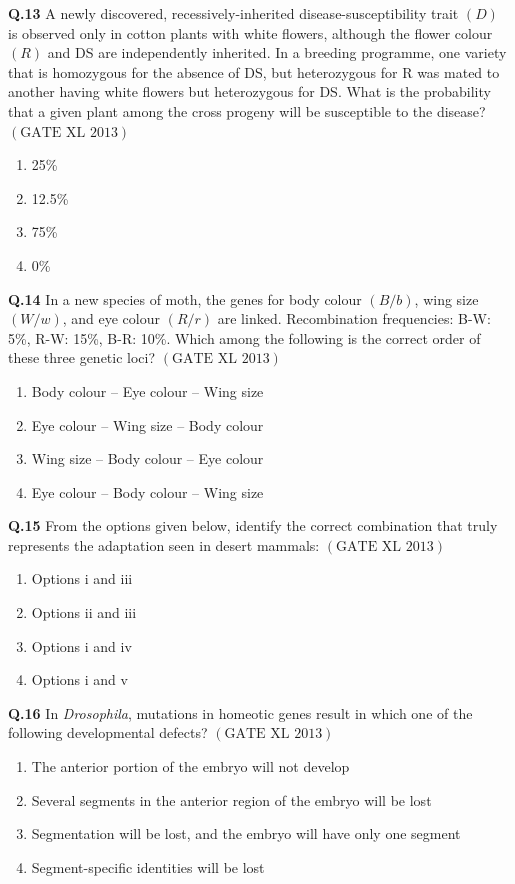 \documentclass[12pt]{article}
\theoremstyle{remark}
\providecommand{\brak}[1]{\ensuremath{\left(#1\right)}}
\begin{document}
\textbf{Q.13} A newly discovered, recessively-inherited disease-susceptibility trait \brak{D} is observed only in cotton plants with white flowers, although the flower colour \brak{R} and DS are independently inherited. In a breeding programme, one variety that is homozygous for the absence of DS, but heterozygous for R was mated to another having white flowers but heterozygous for DS. What is the probability that a given plant among the cross progeny will be susceptible to the disease? \hfill $\brak{\text{GATE XL 2013}}$
\begin{enumerate}
    \item 25\%
    \item 12.5\%
    \item 75\%
    \item 0\%
\end{enumerate}

\textbf{Q.14} In a new species of moth, the genes for body colour \brak{B/b}, wing size \brak{W/w}, and eye colour \brak{R/r} are linked. Recombination frequencies: B-W: 5\%, R-W: 15\%, B-R: 10\%. Which among the following is the correct order of these three genetic loci? \hfill $\brak{\text{GATE XL 2013}}$
\begin{enumerate}
    \item Body colour – Eye colour – Wing size
    \item Eye colour – Wing size – Body colour
    \item Wing size – Body colour – Eye colour
    \item Eye colour – Body colour – Wing size
\end{enumerate}

\textbf{Q.15} From the options given below, identify the correct combination that truly represents the adaptation seen in desert mammals: \hfill $\brak{\text{GATE XL 2013}}$
\begin{enumerate}
    \item Options i and iii
    \item Options ii and iii
    \item Options i and iv
    \item Options i and v
\end{enumerate}

\textbf{Q.16} In \textit{Drosophila}, mutations in homeotic genes result in which one of the following developmental defects? \hfill $\brak{\text{GATE XL 2013}}$
\begin{enumerate}
    \item The anterior portion of the embryo will not develop
    \item Several segments in the anterior region of the embryo will be lost
    \item Segmentation will be lost, and the embryo will have only one segment
    \item Segment-specific identities will be lost
\end{enumerate}
\end{document}
